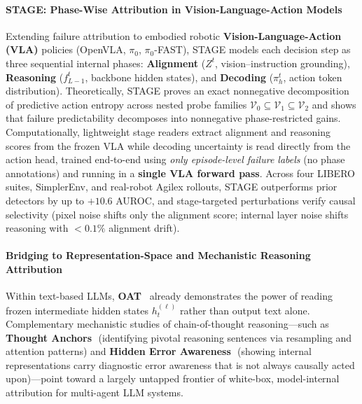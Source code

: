 \paragraph{STAGE: Phase-Wise Attribution in Vision-Language-Action Models~\citep{anonymous2027stage}}
Extending failure attribution to embodied robotic \textbf{Vision-Language-Action (VLA)} policies (OpenVLA, $\pi_0$, $\pi_0$-FAST), STAGE models each decision step as three sequential internal phases: \textbf{Alignment} ($Z^t$, vision--instruction grounding), \textbf{Reasoning} ($f_{L-1}^t$, backbone hidden states), and \textbf{Decoding} ($\pi_h^t$, action token distribution). Theoretically, STAGE proves an exact nonnegative decomposition of predictive action entropy across nested probe families $\mathcal{V}_0 \subseteq \mathcal{V}_1 \subseteq \mathcal{V}_2$ and shows that failure predictability decomposes into nonnegative phase-restricted gains. Computationally, lightweight stage readers extract alignment and reasoning scores from the frozen VLA while decoding uncertainty is read directly from the action head, trained end-to-end using \emph{only episode-level failure labels} (no phase annotations) and running in a \textbf{single VLA forward pass}. Across four LIBERO suites, SimplerEnv, and real-robot Agilex rollouts, STAGE outperforms prior detectors by up to $+10.6$ AUROC, and stage-targeted perturbations verify causal selectivity (pixel noise shifts only the alignment score; internal layer noise shifts reasoning with $<0.1\%$ alignment drift).

\paragraph{Bridging to Representation-Space and Mechanistic Reasoning Attribution}
Within text-based LLMs, \textbf{OAT}~\citep{yeh2026oat} already demonstrates the power of reading frozen intermediate hidden states $h_t^{(\ell)}$ rather than output text alone. Complementary mechanistic studies of chain-of-thought reasoning---such as \textbf{Thought Anchors}~\citep{bogdan2025thoughtanchors}\,\webtag (identifying pivotal reasoning sentences via resampling and attention patterns) and \textbf{Hidden Error Awareness}~\citep{yuan2026hiddenerror}\,\webtag (showing internal representations carry diagnostic error awareness that is not always causally acted upon)---point toward a largely untapped frontier of white-box, model-internal attribution for multi-agent LLM systems.
